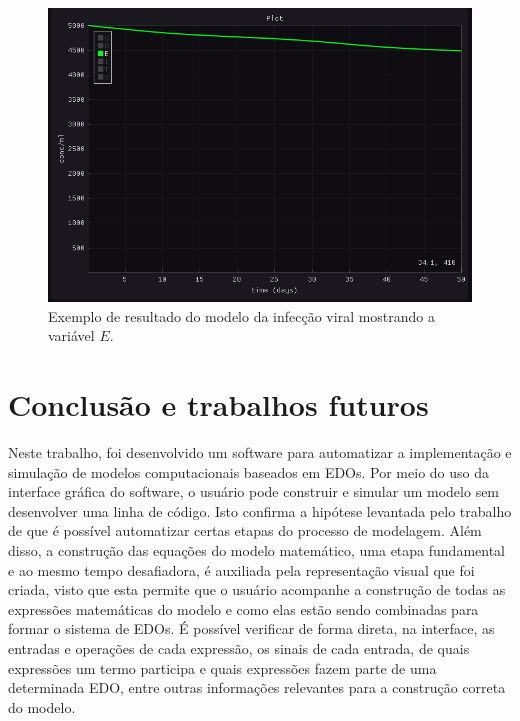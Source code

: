 \documentclass[
	12pt,				%
	openright,			%
	oneside,			%
	a4paper,			%
	main=brazil,
	english,			%
	]{ufsj-abntex2}
\begin{document}
\begin{figure}[h]
    \centering
    \includegraphics[width=\textwidth]{imgs/modelos/resultado2-infeccaoviral.png} 
    \caption{Exemplo de resultado do modelo da infecção viral mostrando a variável $E$.}
    \label{fig:resultado2-infeccaoviral}
\end{figure}

\chapter{Conclusão e trabalhos futuros}
\label{chap:conclusao}

Neste trabalho, foi desenvolvido um software para automatizar a implementação e simulação de modelos computacionais baseados em EDOs. Por meio do uso da interface gráfica do software, o usuário pode construir e simular um modelo sem desenvolver uma linha de código. Isto confirma a hipótese levantada pelo trabalho de que é possível automatizar certas etapas do processo de modelagem. Além disso, a construção das equações do modelo matemático, uma etapa fundamental e ao mesmo tempo desafiadora, é auxiliada pela representação visual que foi criada, visto que esta permite que o usuário acompanhe a construção de todas as expressões matemáticas do modelo e como elas estão sendo combinadas para formar o sistema de EDOs. É possível verificar de forma direta, na interface, as entradas e operações de cada expressão, os sinais de cada entrada, de quais expressões um termo participa e quais expressões fazem parte de uma determinada EDO, entre outras informações relevantes para a construção correta do modelo.   
\end{document}
